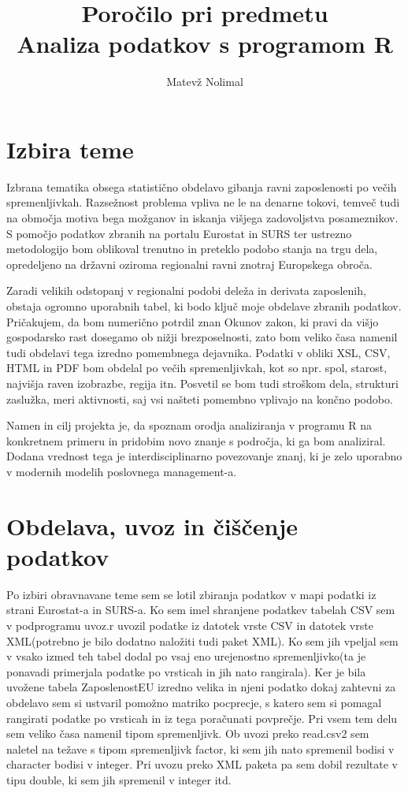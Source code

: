 \documentclass[11pt,a4paper]{article}
\begin{document}
\title{Poročilo pri predmetu \\
Analiza podatkov s programom R}
\author{Matevž Nolimal}

\section{Izbira teme}

Izbrana tematika obsega statistično obdelavo gibanja ravni zaposlenosti po večih spremenljivkah. Razsežnost problema vpliva ne le na denarne tokovi, temveč tudi na območja motiva bega možganov in iskanja višjega zadovoljstva posameznikov. S pomočjo podatkov zbranih na portalu Eurostat in SURS ter ustrezno metodologijo bom oblikoval trenutno in preteklo podobo stanja na trgu dela, opredeljeno na državni oziroma regionalni ravni znotraj Europskega obroča.

Zaradi velikih odstopanj v regionalni podobi deleža in derivata zaposlenih, obstaja ogromno uporabnih tabel, ki bodo ključ moje obdelave zbranih podatkov. Pričakujem, da bom numerično potrdil znan Okunov zakon, ki pravi da višjo gospodarsko rast dosegamo ob nižji brezposelnosti, zato bom veliko časa namenil tudi obdelavi tega izredno pomembnega dejavnika. Podatki v obliki XSL, CSV, HTML in PDF bom obdelal po večih spremenljivkah, kot so npr. spol, starost, najvišja raven izobrazbe, regija itn. Posvetil se bom tudi stroškom dela, strukturi zaslužka, meri aktivnosti, saj vsi našteti pomembno vplivajo na končno podobo. 

Namen in cilj projekta je, da spoznam orodja analiziranja v programu R na konkretnem primeru in pridobim novo znanje s področja, ki ga bom analiziral. Dodana vrednost tega je interdisciplinarno povezovanje znanj, ki je zelo uporabno v modernih modelih poslovnega management-a.
\pagebreak
\section{Obdelava, uvoz in čiščenje podatkov}

Po izbiri obravnavane teme sem se lotil zbiranja podatkov v mapi podatki iz strani Eurostat-a in SURS-a. Ko sem imel shranjene podatkev tabelah CSV sem v podprogramu uvoz.r uvozil podatke iz datotek vrste CSV in datotek vrste XML(potrebno je bilo dodatno naložiti tudi paket XML). Ko sem jih vpeljal sem v vsako izmed teh tabel dodal po vsaj eno urejenostno spremenljivko(ta je ponavadi primerjala podatke po vrsticah in jih nato rangirala). Ker je bila uvožene tabela ZaposlenostEU izredno velika in njeni podatko dokaj zahtevni za obdelavo sem si ustvaril pomožno matriko pocprecje, s katero sem si pomagal rangirati podatke po vrsticah in iz tega poračunati povprečje. Pri vsem tem delu sem veliko časa namenil tipom spremenljivk. Ob uvozi preko read.csv2 sem naletel na težave s tipom spremenljivk factor, ki sem jih nato spremenil bodisi v character bodisi v integer. Pri uvozu preko XML paketa pa sem dobil rezultate v tipu double, ki sem jih spremenil v integer itd.
\end{document}
